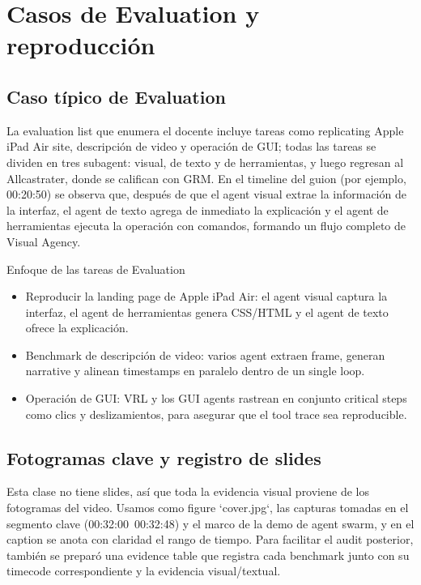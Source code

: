 \section{Casos de Evaluation y reproducción}

\subsection{Caso típico de Evaluation}
La evaluation list que enumera el docente incluye tareas como replicating Apple iPad Air site, descripción de video y operación de GUI; todas las tareas se dividen en tres subagent: visual, de texto y de herramientas, y luego regresan al Allcastrater, donde se califican con GRM. En el timeline del guion (por ejemplo, 00:20:50) se observa que, después de que el agent visual extrae la información de la interfaz, el agent de texto agrega de inmediato la explicación y el agent de herramientas ejecuta la operación con comandos, formando un flujo completo de Visual Agency.

\begin{knowledgebox}{Enfoque de las tareas de Evaluation}
\begin{itemize}
    \item Reproducir la landing page de Apple iPad Air: el agent visual captura la interfaz, el agent de herramientas genera CSS/HTML y el agent de texto ofrece la explicación.
    \item Benchmark de descripción de video: varios agent extraen frame, generan narrative y alinean timestamps en paralelo dentro de un single loop.
    \item Operación de GUI: VRL y los GUI agents rastrean en conjunto critical steps como clics y deslizamientos, para asegurar que el tool trace sea reproducible.
\end{itemize}
\end{knowledgebox}

\subsection{Fotogramas clave y registro de slides}
Esta clase no tiene slides, así que toda la evidencia visual proviene de los fotogramas del video. Usamos como figure `cover.jpg`, las capturas tomadas en el segmento clave (00:32:00~00:32:48) y el marco de la demo de agent swarm, y en el caption se anota con claridad el rango de tiempo. Para facilitar el audit posterior, también se preparó una evidence table que registra cada benchmark junto con su timecode correspondiente y la evidencia visual/textual.

